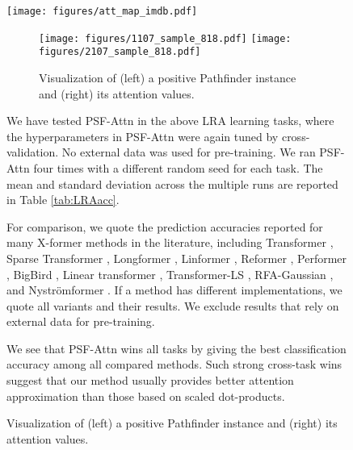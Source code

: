 \documentclass{article}
\begin{document}
\begin{figure}[t]
\begin{center}
\begin{figure*}[t]
	\begin{center}
		\texttt{[image: figures/att\_map\_imdb.pdf]}
	\end{center}
	\caption{Attention vector visualization of a positive review in Text Classification. Darker cells have larger absolute values.}
	\label{fig:attn_IMDb}
	\vspace{-3mm}
\end{figure*}

\newcommand{\attmapfigwidth}{3cm}
\begin{figure}[t]
	\begin{center}
		\texttt{[image: figures/1107\_sample\_818.pdf]}\quad
		\texttt{[image: figures/2107\_sample\_818.pdf]}
	\end{center}
	\vspace{-2mm}
	\caption{Visualization of (left) a positive Pathfinder instance and (right) its attention values.}
	\label{fig:attn_pathfinder}
	\vspace{-3mm}
\end{figure}

We have tested PSF-Attn in the above LRA learning tasks, where the hyperparameters in PSF-Attn were again tuned by cross-validation. No external data was used for pre-training. We ran PSF-Attn four times with a different random seed for each task. The mean and standard deviation across the multiple runs are reported in Table \ref{tab:LRAacc}.

For comparison, we quote the prediction accuracies reported for many X-former methods in the literature, including Transformer \citep{transformer}, Sparse Transformer \citep{child2019generating}, Longformer \citep{beltagy2020longformer}, Linformer \citep{linformer}, Reformer \citep{kitaev2020reformer}, Performer \citep{performer}, BigBird \citep{zaheer2020big}, Linear transformer \citep{katharopoulos2020transformers}, Transformer-LS \citep{zhu2021long}, RFA-Gaussian \citep{peng2021random}, and Nystr\"omformer \citep{xiong2021nystr}. If a method has different implementations, we quote all variants and their results. We exclude results that rely on external data for pre-training.

We see that PSF-Attn wins all tasks by giving the best classification accuracy among all compared methods. Such strong cross-task wins suggest that our method usually provides better attention approximation than those based on scaled dot-products. 


\end{center}
\end{figure}
\end{document}
